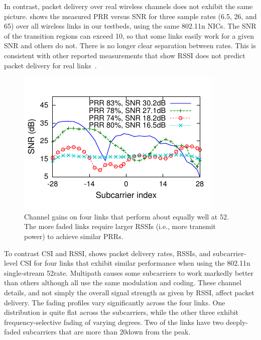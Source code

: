 In contrast, packet delivery over real wireless channels does not exhibit the same picture.  shows the measured PRR versus SNR for three sample rates (6.5, 26, and 65\Mbps) over all wireless links in our testbeds, using the same 802.11n NICs. The SNR of the transition regions can exceed 10\dB, so that some links easily work for a given SNR and others do not. There is no longer clear separation between rates. This is consistent with other reported measurements that show RSSI does not predict packet delivery for real links~\cite{aguayo_roofnet, Reis_sigcomm06, snr_infocom08, zhao_sensys03}.

\begin{figure}[t]
  \centering
  \includegraphics[width=\columnwidth,viewport=2 9 185 108,clip]{figures/esnr/embed_fsf-shape-two-links.pdf}
  \caption{Channel gains on four links that perform about equally well at 52\Mbps. The more faded links require larger RSSIs (i.e., more transmit power) to achieve similar PRRs.}
  \label{fig:example_fsf_shape}

\end{figure}

To contrast CSI and RSSI,  shows packet delivery rates, RSSIs, and subcarrier-level CSI for four links that exhibit similar performance when using the 802.11n single-stream 52\Mbps rate. Multipath causes some subcarriers to work markedly better than others although all use the same modulation and coding. These channel details, and not simply the overall signal strength as given by RSSI, affect packet delivery. The fading profiles vary significantly across the four links. One distribution is quite flat across the subcarriers, while the other three exhibit frequency-selective fading of varying degrees. Two of the links have two deeply-faded subcarriers that are more than 20\dB down from the peak.

